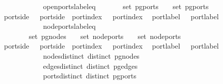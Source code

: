 \ \ \ \ \ \ \ \ \ \ \ open{\isacharunderscore}ports{\isacharunderscore}label{\isacharunderscore}eq{\isacharcolon}\isanewline
\ \ \ \ {\isachardoublequoteopen}{\isasymAnd}\ {\isasymlbrakk}\ {\isasymin}\ set\ {\isacharparenleft}pg{\isacharunderscore}ports\ \ \ {\isasymin}\ set\ {\isacharparenleft}pg{\isacharunderscore}ports\ \isanewline
{}port{\isachardot}side\ \ {\isacharequal}\ port{\isachardot}side\ \ port{\isachardot}index\ \ {\isacharequal}\ port{\isachardot}index\ \isanewline
{}\ port{\isachardot}label\ \ {\isacharequal}\ port{\isachardot}label\ \isanewline
\ \ \ \ \ \ \ \ \ \ \ node{\isacharunderscore}ports{\isacharunderscore}label{\isacharunderscore}eq{\isacharcolon}\isanewline
\ \ \ \ {\isachardoublequoteopen}{\isasymAnd}\ {\isasymlbrakk}\ {\isasymin}\ set\ {\isacharparenleft}pg{\isacharunderscore}nodes\ \ \ {\isasymin}\ set\ {\isacharparenleft}node{\isacharunderscore}ports\ \ \ {\isasymin}\ set\ {\isacharparenleft}node{\isacharunderscore}ports\ \isanewline
{}port{\isachardot}side\ \ {\isacharequal}\ port{\isachardot}side\ \ port{\isachardot}index\ \ {\isacharequal}\ port{\isachardot}index\ \isanewline
{}\ port{\isachardot}label\ \ {\isacharequal}\ port{\isachardot}label\ \isanewline
\ \ \ \ \ \ \ \ \ \ \ nodes{\isacharunderscore}distinct{\isacharcolon}\ {\isachardoublequoteopen}distinct\ {\isacharparenleft}pg{\isacharunderscore}nodes\ \isanewline
\ \ \ \ \ \ \ \ \ \ \ edges{\isacharunderscore}distinct{\isacharcolon}\ {\isachardoublequoteopen}distinct\ {\isacharparenleft}pg{\isacharunderscore}edges\ \isanewline
\ \ \ \ \ \ \ \ \ \ \ ports{\isacharunderscore}distinct{\isacharcolon}\ {\isachardoublequoteopen}distinct\ {\isacharparenleft}pg{\isacharunderscore}ports\ 
